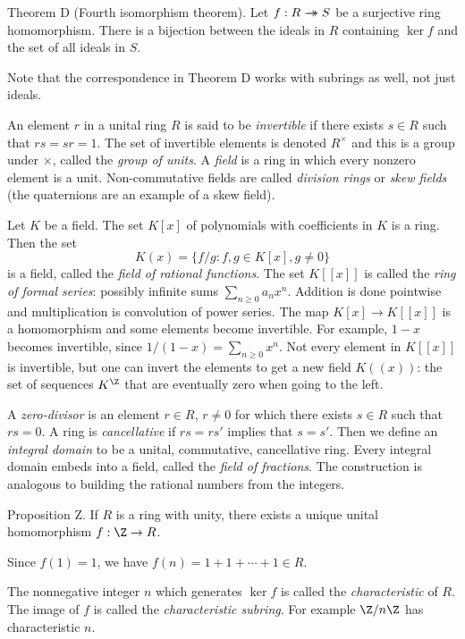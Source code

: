 \parenproclaim Theorem D (Fourth isomorphism theorem). Let $f:R\rightarrow\!\!\!\!\!\rightarrow S$ be a surjective ring homomorphism. There is a bijection between the ideals in $R$ containing $\ker f$ and the set of all ideals in $S$.\slug

Note that the correspondence in Theorem D works with subrings as well, not just ideals.

An element $r$ in a unital ring $R$ is said to be {\it invertible} if there exists $s\in R$ such that $rs = sr = 1$. The set of invertible elements is denoted $R^\times$ and this is a group under $\times$, called the {\it group of units}. A {\it field} is a ring in which every nonzero element is a unit. Non-commutative fields are called {\it division rings} or {\it skew fields} (the quaternions are an example of a skew field).

Let $K$ be a field. The set $K[x]$ of polynomials with coefficients in $K$ is a ring. Then the set
$$K(x) = \{ f / g : f,g\in K[x], g\neq 0\}$$
is a field, called the {\it field of rational functions}. The set $K[[x]]$ is called the {\it ring of formal series}: possibly infinite sums $\sum_{n\geq 0} a_nx^n$. Addition is done pointwise and multiplication is convolution of power series. The map $K[x] \to K[[x]]$ is a homomorphism and some elements become invertible. For example, $1-x$ becomes invertible, since $1/(1-x) = \sum_{n\geq 0} x^n$. Not every element in $K[[x]]$ is invertible, but one can invert the elements to get a new field $K((x))$: the set of sequences $K^\Z$ that are eventually zero when going to the left.

A {\it zero-divisor} is an element $r\in R$, $r\neq 0$ for which there exists $s\in R$ such that $rs = 0$. A ring is {\it cancellative} if $rs = rs'$ implies that $s = s'$. Then we define an {\it integral domain} to be a unital, commutative, cancellative ring. Every integral domain embeds into a field, called the {\it field of fractions}. The construction is analogous to building the rational numbers from the integers.

\proclaim Proposition Z. If $R$ is a ring with unity, there exists a unique unital homomorphism $f:\Z\to R$.\slug

\proof Since $f(1) = 1$, we have $f(n) = 1 + 1 + \cdots + 1 \in R$.\slug

The nonnegative integer $n$ which generates $\ker f$ is called the {\it characteristic} of $R$. The image of $f$ is called the {\it characteristic subring}. For example $\Z/n\Z$ has characteristic $n$.

